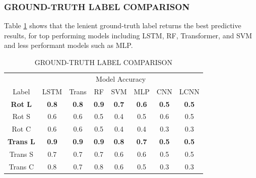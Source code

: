 \documentclass{ieeeaccess}
\begin{document}
\subsubsection{GROUND-TRUTH LABEL COMPARISON}
Table \ref{table6} shows that the lenient ground-truth label returns the best predictive results, for top performing models including LSTM, RF, Transformer, and SVM and less performant models such as MLP.
\begin{table}[h!]
\caption{GROUND-TRUTH LABEL COMPARISON}
\label{table6}
\centering
\begin{tabular}{c|ccccccc}
\hline
& \multicolumn{7}{c}{\centering Model Accuracy}\\
Label & LSTM & Trans & RF & SVM & MLP & CNN & LCNN\\
\hline
\textbf{Rot L} & \textbf{0.8} & \textbf{0.8} & \textbf{0.9} & \textbf{0.7} & \textbf{0.6} & \textbf{0.5} & \textbf{0.5}\\
Rot S & 0.6 & 0.6 & 0.5 & 0.4 & 0.5 & 0.6 & 0.5\\
Rot C & 0.6 & 0.6 & 0.5 & 0.4 & 0.4 & 0.3 & 0.3\\
\hline
\textbf{Trans L} & \textbf{0.9} & \textbf{0.9} & \textbf{0.9} & \textbf{0.8} & \textbf{0.7} & \textbf{0.5} & \textbf{0.5}\\
Trans S & 0.7 & 0.7 & 0.7 & 0.6 & 0.6 & 0.5 & 0.5\\
Trans C & 0.8 & 0.7 & 0.8 & 0.6 & 0.5 & 0.3 & 0.3\\
\hline
\end{tabular}
\end{table}
\end{document}
